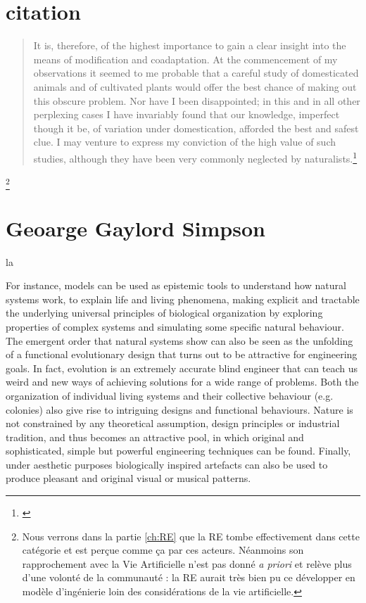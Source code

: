 \section{citation}
\begin{quote}
	It is, therefore, of the highest importance to gain a clear insight into the means of modification and coadaptation. At the commencement of my observations it seemed to me probable that a careful study of domesticated animals and of cultivated plants would offer the best chance of making out this obscure problem. Nor have I been disappointed; in this and in all other perplexing cases I have invariably found that our knowledge, imperfect though it be, of variation under domestication, afforded the best and safest clue. I may venture to express my conviction of the high value of such studies, although they have been very commonly neglected by naturalists.\footnote{\citet[Introduction p. 27 ]{darwin1859originspeciesbymeansnaturalselectionorpreservationfavouredracesstrugglelife}}
\end{quote}

\footnote{Nous verrons dans la partie \ref{ch:RE} que la RE tombe effectivement dans cette catégorie et est perçue comme ça par ces acteurs. Néanmoins son rapprochement avec la Vie Artificielle n'est pas donné \emph{a priori} et relève plus d'une volonté de la communauté : la RE aurait très bien pu ce développer en modèle d'ingénierie loin des considérations de la vie artificielle.}


\section{Geoarge Gaylord Simpson}
la 



For instance, models can be used as epistemic tools to understand how natural systems work, to explain life and living phenomena, making explicit and tractable the underlying universal principles of biological organization by exploring properties of complex systems and simulating some specific natural behaviour.    The emergent order that natural systems show can also be seen as the unfolding of a functional evolutionary design that turns out to be attractive for engineering goals. In fact, evolution is an extremely accurate blind engineer that can teach us weird and new ways of achieving solutions for a wide range of problems. Both the organization of individual living systems and their collective behaviour (e.g. colonies) also give rise to intriguing designs and functional behaviours. Nature is not constrained by any theoretical assumption, design principles or industrial tradition, and thus becomes an attractive pool, in which original and sophisticated, simple but powerful engineering techniques can be found. Finally, under aesthetic purposes biologically inspired artefacts can also be used to produce pleasant and original visual or musical patterns.
\cite{barandiaran06alifemodelsasepistemicartefacts}
